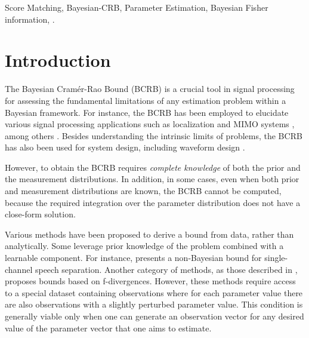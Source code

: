 \documentclass[journal,twoside,web]{ieeecolor}
\begin{document}
\begin{IEEEkeywords}
 Score Matching, Bayesian-CRB, Parameter Estimation, Bayesian Fisher information, \pe{}.
\end{IEEEkeywords}

\section{Introduction}
The Bayesian Cramér-Rao Bound (BCRB) \cite{van2004detection} is a crucial tool in signal processing for {assessing} the fundamental limitations of any estimation problem within a Bayesian framework. For instance, the BCRB has been employed to elucidate various signal processing applications such as localization \cite{10184105,10140073} and MIMO systems \cite{nasir2013phase}, among others \cite{xu2004bayesian,rosentha2024asymptotically,mazor2024limitations}. Besides understanding the intrinsic limits of problems, the BCRB has also been used for system design, including waveform design \cite{huleihel2013optimal,turlapaty2014bayesian,zuo2010conditional,sun2024optimal}. 

However, to obtain the BCRB requires \emph{complete knowledge} of both the prior and the measurement distributions. In addition, in  some cases, even when both prior and measurement distributions are known, the BCRB cannot be computed, because the required integration over the parameter distribution does not have a close-form solution.  

Various methods have been proposed %
to derive a bound from data, {rather than analytically.} Some leverage prior knowledge of the problem combined with a learnable component. For instance, \cite{lutati22_interspeech} presents a non-Bayesian bound for single-channel speech separation. Another category of methods, as those described in \cite{duy2022fisher,6975144}, proposes bounds based on f-divergences. However, these methods require access to a {special} dataset {containing observations where for each parameter value there are also observations with a slightly perturbed parameter value.} 
This condition is generally viable only when one can generate an observation vector {for any desired value of the parameter vector that one aims to estimate}. 
\end{document}
